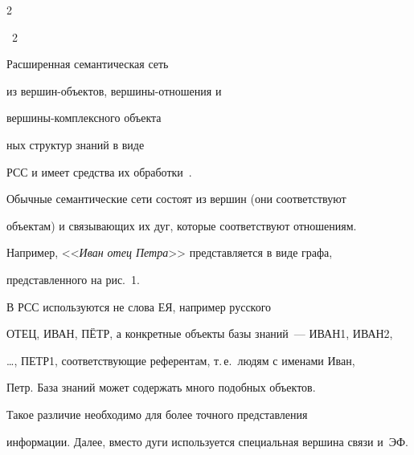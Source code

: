 \begin{multicols}{2}
\begin{center}
{}


\end{center}





\noindent


{{\figurename~2}\ \ \small{Расширенная семантическая сеть


из вер\-шин-объ\-ек\-тов, вер\-ши\-ны-от\-но\-ше\-ния и


вер\-ши\-ны-комп\-лек\-сно\-го объ\-ек\-та}}





\addtocounter{figure}{2}





\vspace*{8pt}





\noindent


ных структур знаний в виде


РСС и имеет средства их обработки~\cite{ ma-l4, ma-l5}.





 Обычные семантические сети состоят из вершин (они соответствуют


объектам) и связывающих их дуг, которые соответствуют отношениям.


Например, <<\textit{Иван отец Петра}>> представляется в виде графа,


представленного на рис.~1.








 В РСС используются не слова ЕЯ, например русского


ОТЕЦ, ИВАН, ПЁТР, а конкретные объекты базы знаний~--- ИВАН1, ИВАН2,


\ldots, ПЕТР1, соответствующие референтам, т.\,е.\ людям с именами Иван,


Петр. База знаний может содержать много подобных объектов.





 Такое различие необходимо для более точного представления


информации. Далее, вместо дуги используется специальная вершина связи и~ЭФ.









\end{multicols}
